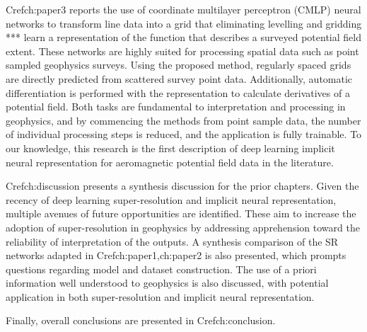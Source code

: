 \documentclass[manuscript.tex]{subfiles}
\begin{document}
Cref{ch:paper3} reports the use of coordinate multilayer perceptron (CMLP) neural networks to transform line data into a grid that eliminating levelling and gridding
*** learn a representation of the function that describes a surveyed potential field extent.
These networks are highly suited for processing spatial data such as point sampled geophysics surveys.
Using the proposed method, regularly spaced grids are directly predicted from scattered survey point data.
Additionally, automatic differentiation is performed with the representation to calculate derivatives of a potential field.
Both tasks are fundamental to interpretation and processing in geophysics, and by commencing the methods from point sample data, the number of individual processing steps is reduced, and the application is fully trainable.
To our knowledge, this research is the first description of deep learning implicit neural representation for aeromagnetic potential field data in the literature.

Cref{ch:discussion} presents a synthesis discussion for the prior chapters. Given the recency of deep learning super-resolution and implicit neural representation, multiple avenues of future opportunities are identified.
These aim to increase the adoption of super-resolution in geophysics by addressing apprehension toward the reliability of interpretation of the outputs.
A synthesis comparison of the SR networks adapted in Cref{ch:paper1,ch:paper2} is also presented, which prompts questions regarding model and dataset construction.
The use of a priori information well understood to geophysics is also discussed, with potential application in both super-resolution and implicit neural representation.

Finally, overall conclusions are presented in Cref{ch:conclusion}.
\end{document}
